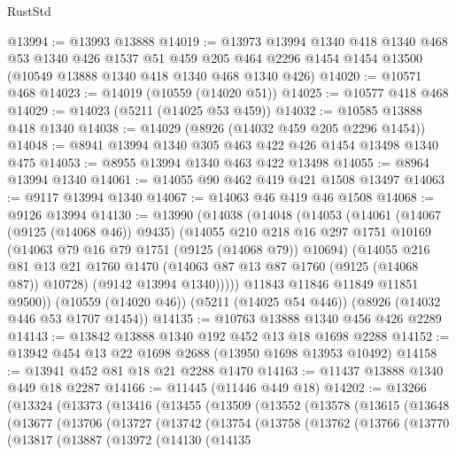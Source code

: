 \begin{lexlean}{RustStd}
\begin{coremodule}
@13994 := @13993 @13888
@14019 := @13973
    @13994
    @1340
    @418
    @1340
    @468
    @53
    @1340
    @426
    @1537
    @51
    @459
    @205
    @464
    @2296
    @1454
    @1454
    @13500
    (@10549 @13888 @1340 @418 @1340 @468 @1340 @426)
@14020 := @10571 @468
@14023 := @14019 (@10559 (@14020 @51))
@14025 := @10577 @418 @468
@14029 := @14023 (@5211 (@14025 @53 @459))
@14032 := @10585 @13888 @418 @1340
@14038 := @14029 (@8926 (@14032 @459 @205 @2296 @1454))
@14048 := @8941 @13994 @1340 @305 @463 @422 @426 @1454 @13498 @1340 @475
@14053 := @8955 @13994 @1340 @463 @422 @13498
@14055 := @8964 @13994 @1340
@14061 := @14055 @90 @462 @419 @421 @1508 @13497
@14063 := @9117 @13994 @1340
@14067 := @14063 @46 @419 @46 @1508
@14068 := @9126 @13994
@14130 := @13990
    (@14038
      (@14048
        (@14053
          (@14061
            (@14067 (@9125 (@14068 @46)) @9435)
            (@14055
              @210
              @218
              @16
              @297
              @1751
              @10169
              (@14063 @79 @16 @79 @1751 (@9125 (@14068 @79)) @10694)
              (@14055
                @216
                @81
                @13
                @21
                @1760
                @1470
                (@14063 @87 @13 @87 @1760 (@9125 (@14068 @87)) @10728)
                (@9142 @13994 @1340)))))
        @11843
        @11846
        @11849
        @11851
        @9500))
    (@10559 (@14020 @46))
    (@5211 (@14025 @54 @446))
    (@8926 (@14032 @446 @53 @1707 @1454))
@14135 := @10763 @13888 @1340 @456 @426 @2289
@14143 := @13842 @13888 @1340 @192 @452 @13 @18 @1698 @2288
@14152 := @13942 @454 @13 @22 @1698 @2688 (@13950 @1698 @13953 @10492)
@14158 := @13941 @452 @81 @18 @21 @2288 @1470
@14163 := @11437 @13888 @1340 @449 @18 @2287
@14166 := @11445 (@11446 @449 @18)
@14202 := @13266
    (@13324
      (@13373
        (@13416
          (@13455
            (@13509
              (@13552
                (@13578
                  (@13615
                    (@13648
                      (@13677
                        (@13706
                          (@13727
                            (@13742
                              (@13754
                                (@13758
                                  (@13762
                                    (@13766
                                      (@13770
                                        (@13817
                                          (@13887
                                            (@13972
                                              (@14130
                                                (@14135

\end{coremodule}
\end{lexlean}
